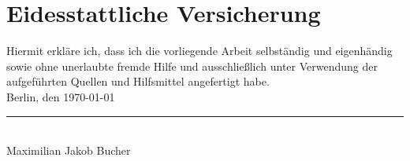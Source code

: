 \chapter[Disclaimer]{Eidesstattliche Versicherung}
Hiermit erkläre ich, dass ich die vorliegende Arbeit selbständig und eigenhändig sowie ohne unerlaubte fremde Hilfe und ausschließlich unter Verwendung der aufgeführten Quellen und Hilfsmittel angefertigt habe.\\

Berlin, den \textsc{\today}\\
\hspace{2.5cm}\rule{8cm}{0.4pt}\\
\hspace{2.5cm}Maximilian Jakob Bucher
